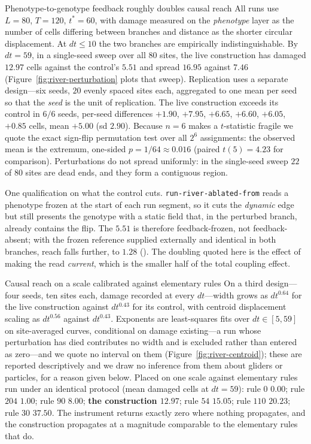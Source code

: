 \begin{empiricalfinding}[label={find:causal}]{Phenotype-to-genotype feedback roughly doubles causal reach}
All runs use $L = 80$, $T = 120$, $t^{*} = 60$, with damage measured on the
\emph{phenotype} layer as the number of cells differing between branches and
distance as the shorter circular displacement. At $dt \le 10$ the two branches
are empirically indistinguishable. By $dt = 59$, in a single-seed sweep over all
$80$ sites, the live construction has damaged $12.97$ cells against the
control's $5.51$ and spread $16.95$ against $7.46$
(Figure~\ref{fig:river-perturbation} plots that sweep). Replication uses a
separate design---six seeds, $20$ evenly spaced sites each, aggregated to one
mean per seed so that the \emph{seed} is the unit of replication. The live
construction exceeds its control in $6/6$ seeds, per-seed differences
$+1.90$, $+7.95$, $+6.65$, $+6.60$, $+6.05$, $+0.85$ cells, mean $+5.00$
(sd $2.90$). Because $n = 6$ makes a $t$-statistic fragile we quote the exact
sign-flip permutation test over all $2^{6}$ assignments: the observed mean is
the extremum, one-sided $p = 1/64 \approx 0.016$ (paired $t(5) = 4.23$ for
comparison). Perturbations do not spread uniformly: in the single-seed sweep
$22$ of $80$ sites are dead ends, and they form a contiguous region.

One qualification on what the control cuts. \texttt{run-river-ablated-from}
reads a phenotype frozen at the start of each run segment, so it cuts the
\emph{dynamic} edge but still presents the genotype with a static field that,
in the perturbed branch, already contains the flip. The $5.51$ is therefore
feedback-frozen, not feedback-absent; with the frozen reference supplied
externally and identical in both branches, reach falls further, to $1.28$
(). The doubling quoted here is the effect of making the
read \emph{current}, which is the smaller half of the total coupling effect.
\end{empiricalfinding}

\begin{empiricalfinding}[label={find:ladder}]{Causal reach on a scale calibrated against elementary rules}
On a third design---four seeds, ten sites each, damage recorded at every
$dt$---width grows as $dt^{0.64}$ for the live construction against $dt^{0.43}$
for its control, with centroid displacement scaling as $dt^{0.56}$ against
$dt^{0.43}$. Exponents are least-squares fits over $dt \in [5,59]$ on
site-averaged curves, conditional on damage existing---a run whose perturbation
has died contributes no width and is excluded rather than entered as zero---and
we quote no interval on them
(Figure~\ref{fig:river-centroid}); these are reported descriptively and we draw
no inference from them about gliders or particles, for a reason given below.
Placed on one scale against elementary rules run under an identical protocol
(mean damaged cells at $dt=59$): rule $0$ $0.00$; rule $204$ $1.00$; rule $90$
$8.00$; \textbf{the construction $12.97$}; rule $54$ $15.05$; rule $110$
$20.23$; rule $30$ $37.50$. The instrument returns exactly zero where nothing
propagates, and the construction propagates at a magnitude comparable to the
elementary rules that do.
\end{empiricalfinding}

